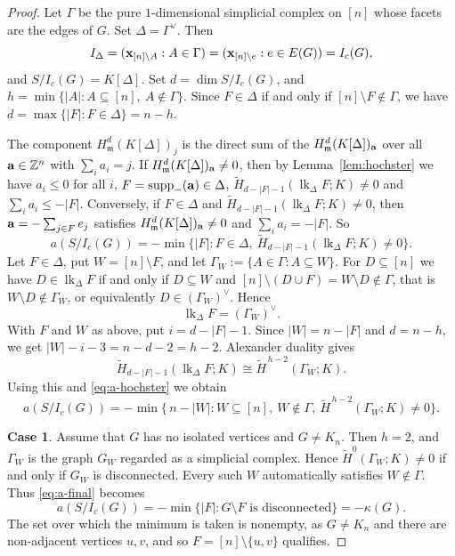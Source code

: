 \documentclass[12pt]{amsart}
\begin{document}
\begin{proof}
Let $\Gamma$ be the pure $1$-dimensional simplicial complex on $[n]$ whose facets are the edges of $G$. Set
$\Delta=\Gamma^\vee$. Then
\[
I_\Delta=({\bf x}_{[n]\setminus A} : A\in\Gamma)=({\bf x}_{[n]\setminus e} : e\in E(G))=I_c(G),
\]
and $S/I_c(G)=K[\Delta]$.
Set $d=\dim S/I_c(G)$, and  $h=\min\{|A| : A\subseteq[n],\ A\notin\Gamma\}$. Since $F\in\Delta$ if and only if $[n]\setminus F\notin\Gamma$, we have
$d=\max\{|F|:F\in\Delta\}=n-h$.

The component $H^d_{\mathfrak m}(K[\Delta])_j$ is the direct sum of the $H^d_{\mathfrak m}(K[\Delta])_{{\bf a}}$ over all ${\bf a}\in\mathbb Z^n$ with $\sum_i a_i=j$.
If $H^d_{\mathfrak m}(K[\Delta])_{{\bf a}}\neq0$, then by Lemma~\ref{lem:hochster} we have $a_i\le0$ for all $i$, $F=\operatorname{supp}_-({\bf a})\in\Delta$, $\widetilde H_{d-|F|-1}(\operatorname{lk}_\Delta F;K)\neq0$ and $\sum_ia_i\le-|F|$.
Conversely, if $F\in\Delta$ and $\widetilde H_{d-|F|-1}(\operatorname{lk}_\Delta F;K)\neq0$, then ${\bf a}=-\sum_{j\in F}e_j$ satisfies $H^d_{\mathfrak m}(K[\Delta])_{{\bf a}}\neq0$ and $\sum_ia_i=-|F|$.
So
\begin{equation}\label{eq:a-hochster}
a(S/I_c(G))=-\min\bigl\{|F| : F\in\Delta,\ \widetilde H_{d-|F|-1}(\operatorname{lk}_\Delta F;K)\neq0\bigr\}.
\end{equation}
Let $F\in\Delta$, put $W=[n]\setminus F$, and let $\Gamma_W:=\{A\in\Gamma : A\subseteq W\}$. For $D\subseteq[n]$ we have $D\in\operatorname{lk}_\Delta F$ if and only if $D\subseteq W$ and $[n]\setminus(D\cup F)=W\setminus D\notin\Gamma$, that is $W\setminus D\notin\Gamma_W$, or equivalently $D\in (\Gamma_W)^\vee$. Hence
\[
\operatorname{lk}_\Delta F=(\Gamma_W)^\vee.
\]
With $F$ and $W$ as above, put $i=d-|F|-1$. Since $|W|=n-|F|$ and $d=n-h$, we get $|W|-i-3=n-d-2=h-2$. Alexander duality  gives
\[
\widetilde H_{d-|F|-1}(\operatorname{lk}_\Delta F;K)\cong\widetilde H^{\,h-2}(\Gamma_W;K).
\]
Using this and \eqref{eq:a-hochster} we obtain
\begin{equation}\label{eq:a-final}
a(S/I_c(G))=-\min\bigl\{\,n-|W| : W\subseteq[n],\ W\notin\Gamma,\ \widetilde H^{\,h-2}(\Gamma_W;K)\neq0\bigr\}.
\end{equation}

{\bf Case 1}. Assume that $G$ has no isolated vertices and $G\neq K_n$. Then $h=2$, and  $\Gamma_W$ is the graph $G_W$ regarded as a simplicial complex. Hence $\widetilde H^0(\Gamma_W;K)\neq0$ if and only if $G_W$ is disconnected. Every such $W$ automatically satisfies $W\notin\Gamma$. Thus \eqref{eq:a-final} becomes
\[
a(S/I_c(G))=-\min\{|F| : G\setminus F\text{ is disconnected}\}=-\kappa(G).
\]
The set over which the minimum is taken is nonempty, as $G\neq K_n$ and there are non-adjacent vertices $u,v$, and so $F=[n]\setminus\{u,v\}$ qualifies.
\smallskip


\end{proof}
\end{document}
